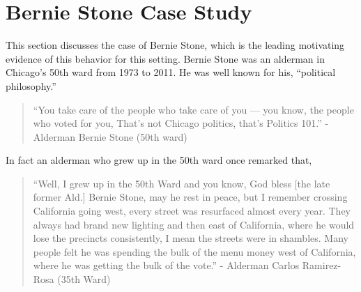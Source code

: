 \section{Bernie Stone Case Study}\label{sec:case_study}
This section discusses the case of Bernie Stone, which is the leading motivating evidence of this behavior for this setting.
Bernie Stone was an alderman in Chicago's 50th ward from 1973 to 2011.
He was well known for his, ``political philosophy.''

\begin{quotation}
    ``You take care of the people who take care of you — you know, the people who voted for you, That’s not Chicago politics, that’s Politics 101.'' - Alderman Bernie Stone (50th ward) \citep{BGA_berniequote}
\end{quotation}

In fact an alderman who grew up in the 50th ward once remarked that,

\begin{quotation}
    ``Well, I grew up in the 50th Ward and you know, God bless [the late former Ald.] Bernie Stone, may he rest in peace, but I remember crossing California going west, every street was resurfaced almost every year. They always had brand new lighting and then east of California, where he would lose the precincts consistently, I mean the streets were in shambles. Many people felt he was spending the bulk of the menu money west of California, where he was getting the bulk of the vote.'' - Alderman Carlos Ramirez-Rosa (35th Ward) \citep{ramirezrosaquote}
\end{quotation}

